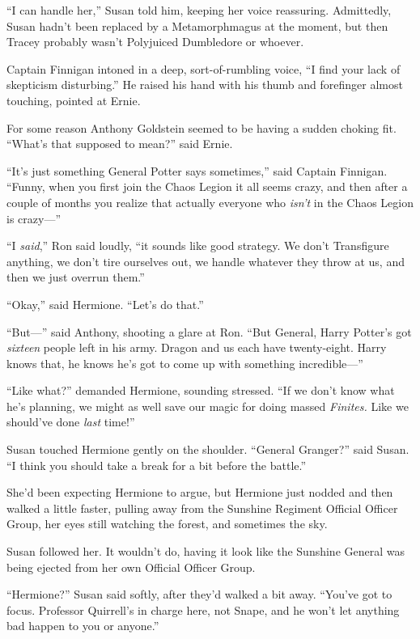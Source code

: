 “I can handle her,” Susan told him, keeping her voice reassuring. Admittedly,
Susan hadn’t been replaced by a Metamorphmagus at the moment, but then Tracey
probably wasn’t Polyjuiced Dumbledore or whoever.

Captain Finnigan intoned in a deep, sort-of-rumbling voice, “I find your lack
of skepticism disturbing.” He raised his hand with his thumb and forefinger
almost touching, pointed at Ernie.

For some reason Anthony Goldstein seemed to be having a sudden choking fit.
“What’s that supposed to mean?” said Ernie.

“It’s just something General Potter says sometimes,” said Captain Finnigan.
“Funny, when you first join the Chaos Legion it all seems crazy, and then after
a couple of months you realize that actually everyone who \emph{isn’t} in the
Chaos Legion is crazy—”

“I \emph{said},” Ron said loudly, “it sounds like good strategy. We don’t
Transfigure anything, we don’t tire ourselves out, we handle whatever they
throw at us, and then we just overrun them.”

“Okay,” said Hermione. “Let’s do that.”

“But—” said Anthony, shooting a glare at Ron. “But General, Harry Potter’s
got \emph{sixteen} people left in his army. Dragon and us each have
twenty-eight. Harry knows that, he knows he’s got to come up with something
incredible—”

“Like what?” demanded Hermione, sounding stressed. “If we don’t know what he’s
planning, we might as well save our magic for doing massed \emph{Finites.} Like
we should’ve done \emph{last} time!”

Susan touched Hermione gently on the shoulder. “General Granger?” said Susan.
“I think you should take a break for a bit before the battle.”

She’d been expecting Hermione to argue, but Hermione just nodded and then
walked a little faster, pulling away from the Sunshine Regiment Official
Officer Group, her eyes still watching the forest, and sometimes the sky.

Susan followed her. It wouldn’t do, having it look like the Sunshine General
was being ejected from her own Official Officer Group.

“Hermione?” Susan said softly, after they’d walked a bit away. “You’ve got to
focus. Professor Quirrell’s in charge here, not Snape, and he won’t let
anything bad happen to you or anyone.”

